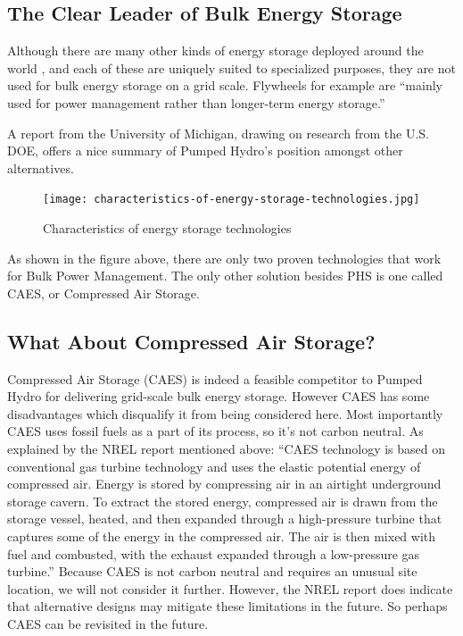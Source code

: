 \documentclass[hidelinks,12pt,a4paper]{article}
\begin{document}
\subsection{The Clear Leader of Bulk Energy Storage}
Although there are many other kinds of energy storage deployed around the world \cite{OpenListOfNonPumpedStorageProjects}, and each of these are uniquely suited to specialized purposes, they are not used for bulk energy storage on a grid scale. Flywheels for example are “mainly used for power management rather than longer-term energy storage.” \cite{USGridEnergyStorageFactsheet}

A report from the University of Michigan, drawing on research from the U.S. DOE, offers a nice summary of Pumped Hydro's position amongst other alternatives.

\begin{figure}[ht!]
    \centering
    \texttt{[image: characteristics-of-energy-storage-technologies.jpg]}
    \caption{Characteristics of energy storage technologies \cite{USGridEnergyStorageFactsheet}}
\end{figure}
\FloatBarrier

As shown in the figure above, there are only two proven technologies that work for Bulk Power Management. The only other solution besides PHS is one called CAES, or Compressed Air Storage.

\subsection{What About Compressed Air Storage?}
Compressed Air Storage (CAES) is indeed a feasible competitor to Pumped Hydro for delivering grid-scale bulk energy storage. However CAES has some disadvantages which disqualify it from being considered here. Most importantly CAES uses fossil fuels as a part of its process, so it's not carbon neutral. As explained by the NREL report mentioned above: “CAES technology is based on conventional gas turbine technology and uses the elastic potential energy of compressed air. Energy is stored by compressing air in an airtight underground storage cavern. To extract the stored energy, compressed air is drawn from the storage vessel, heated, and then expanded through a high-pressure turbine that captures some of the energy in the compressed air. The air is then mixed with fuel and combusted, with the exhaust expanded through a low-pressure gas turbine.” \cite{TheRoleOfEnergyStorageWithRenewableElectricityGeneration} Because CAES is not carbon neutral and requires an unusual site location, we will not consider it further. However, the NREL report does indicate that alternative designs may mitigate these limitations in the future. So perhaps CAES can be revisited in the future.
\end{document}

